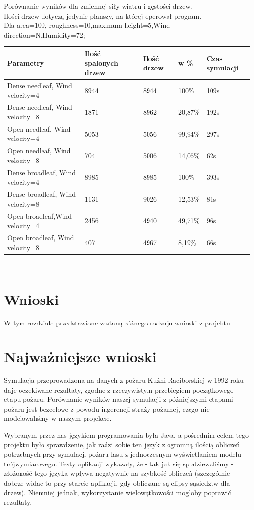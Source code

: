 \documentclass[a4paper, 11pt]{article}
\begin{document}
	Porównanie wyników dla zmiennej siły wiatru i gęstości drzew.\\
	Ilości drzew dotyczą jedynie planszy, na której operował program.\\
	Dla area=100, roughness=10,maximum height=5,Wind direction=N,Humidity=72;\\
	\begin{tabular}{|l|l|l|l|l|} \hline	
Parametry	& Ilość spalonych drzew & Ilość drzew	& w \% &Czas symulacji \\ \hline
Dense needleaf, Wind velocity=4 & 8944 & 8944 & 100\% &109s \\ \hline
Dense needleaf, Wind velocity=8 & 1871 & 8962 & 20,87\% &192s\\ \hline
Open needleaf, Wind velocity=4 & 5053 & 5056 & 99,94\%&297s\\ \hline
Open needleaf, Wind velocity=8 & 704 & 5006 & 14,06\%& 62s\\ \hline
Dense broadleaf, Wind velocity=4 & 8985 & 8985 & 100\% &393s\\ \hline %
Dense broadleaf, Wind velocity=8 & 1131 & 9026 & 12,53\%&81s\\ \hline
Open broadleaf,Wind velocity=4 & 2456 & 4940 & 49,71\% &96s\\ \hline
Open broadleaf, Wind velocity=8 & 407 & 4967 & 8,19\% &66s \\ \hline

\end{tabular}\\[1cm]
	\section{Wnioski}
	\indent
	
		W tym rozdziale przedstawione zostaną różnego rodzaju wnioski z projektu.
	\section*{Najważniejsze wnioski}
	\indent
	
		Symulacja przeprowadzona na danych z pożaru Kuźni Raciborskiej w 1992 roku daje oczekiwane rezultaty, zgodne z rzeczywistym przebiegiem początkowego etapu pożaru. Porównanie wyników naszej symulacji z późniejszymi etapami pożaru jest bezcelowe z powodu ingerencji straży pożarnej, czego nie modelowaliśmy w naszym projekcie. 
		
		Wybranym przez nas językiem programowania była Java, a pośrednim celem tego projektu było sprawdzenie, jak radzi sobie ten język z ogromną ilością obliczeń potrzebnych przy symulacji pożaru lasu z jednoczesnym wyświetlaniem modelu trójwymiarowego. Testy aplikacji wykazały, że - tak jak się spodziewaliśmy - złożoność tego języka wpływa negatywnie na szybkość obliczeń (szczególnie dobrze widać to przy starcie aplikacji, gdy obliczane są elipsy sąsiedztw dla drzew). Niemniej jednak, wykorzystanie wielowątkowości mogłoby poprawić rezultaty. 
		
\end{document}
